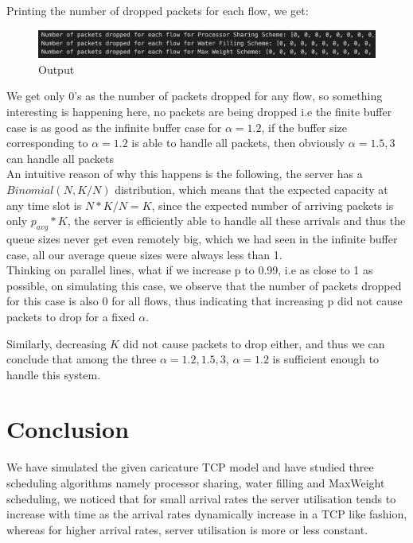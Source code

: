 \documentclass[11pt, a4paper]{article}
\begin{document}
Printing the number of dropped packets for each flow, we get:
\begin{figure}[H]
     \centering
     \includegraphics[scale=0.2]{fig_c.png}
     \caption{Output}
\end{figure}

We get only 0's as the number of packets dropped for any flow, so something interesting is happening here, no packets are being dropped i.e the finite buffer case is as good as the infinite buffer case for $\alpha = 1.2$, if the buffer size corresponding to $\alpha = 1.2$ is able to handle all packets, then obviously $\alpha = 1.5, 3$ can handle all packets\\

An intuitive reason of why this happens is the following, the server has a $Binomial(N,K/N)$ distribution, which means that the expected capacity at any time slot is $N*K/N = K$, since the expected number of arriving packets is only $p_{avg}*K$, the server is efficiently able to handle all these arrivals and thus the queue sizes never get even remotely big, which we had seen in the infinite buffer case, all our average queue sizes were always less than 1.\\

Thinking on parallel lines, what if we increase p to 0.99, i.e as close to 1 as possible, on simulating this case, we observe that the number of packets dropped for this case is also 0 for all flows, thus indicating that increasing p did not cause packets to drop for a fixed $\alpha$.

Similarly, decreasing $K$ did not cause packets to drop either, and thus we can conclude that among the three $\alpha = 1.2, 1.5, 3$, $\alpha=1.2$ is sufficient enough to handle this system.


\section{Conclusion}
We have simulated the given caricature TCP model and have studied three scheduling algorithms namely processor sharing, water filling and MaxWeight scheduling, we noticed that for small arrival rates the server utilisation tends to increase with time as the arrival rates dynamically increase in a TCP like fashion, whereas for higher arrival rates, server utilisation is more or less constant.\\
\end{document}
